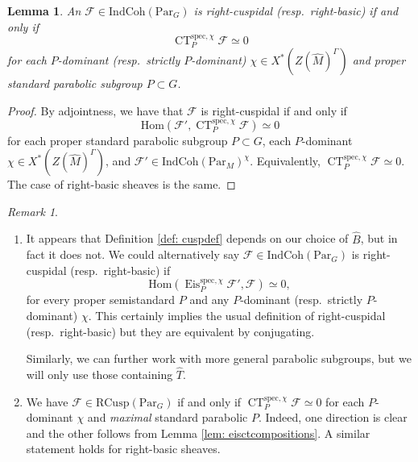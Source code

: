 \documentclass{amsart}
\newtheorem{lemma}[theorem]{Lemma}
\theoremstyle{definition}
\theoremstyle{remark}
\newtheorem{remark}[theorem]{Remark}
\numberwithin{equation}{section}
\newcommand{\mc}{\mathcal}
\newcommand{\Hom}{\mathrm{Hom}}
\newcommand{\spec}{\mathrm{spec}}
\newcommand{\wh}{\widehat}
\newcommand{\Par}{\mathrm{Par}}
\newcommand{\IndCoh}{\mathrm{IndCoh}}
\DeclareMathOperator{\Eis}{\mathrm{Eis}}
\DeclareMathOperator{\CT}{\mathrm{CT}}
\newcommand{\RCusp}{\mathrm{RCusp}}
\begin{document}
\begin{lemma}{\label{lem: cuspconstanttermdef}}
    An $\mc{F} \in \IndCoh(\Par_G)$ is right-cuspidal (resp.~right-basic) if and only if 
    \[
    \CT^{\spec, \chi}_{P} \mc{F} \simeq 0
    \]
    for each $P$-dominant (resp.~strictly $P$-dominant) $\chi \in X^*(Z(\wh{M})^{\Gamma})$ and proper standard parabolic subgroup $P \subset G$. 
\end{lemma}
\begin{proof}
By adjointness, we have that $\mc{F}$ is right-cuspidal if and only if \[
\Hom( \mc{F}', \CT^{\spec, \chi}_{P} \mc{F})\simeq 0\] for each proper standard parabolic subgroup $P \subset G$, each $P$-dominant $\chi \in X^*(Z(\wh{M})^{\Gamma})$, and $\mc{F}' \in \IndCoh(\Par_M)^{\chi}$. Equivalently, $\CT^{\spec, \chi}_{P} \mc{F} \simeq 0$. The case of right-basic sheaves is the same. 
\end{proof}
\begin{remark}{\label{rem: cuspbasicproperties}}
\begin{enumerate}
 \item  It appears that Definition \ref{def: cuspdef} depends on our choice of $\wh{B}$, but in fact it does not. We could alternatively say $\mc{F} \in \IndCoh(\Par_G)$ is right-cuspidal (resp.~right-basic) if \begin{equation*}
        \Hom(\Eis^{\spec, \chi}_{P} \mc{F}', \mc{F}) \simeq 0,
    \end{equation*}
    for every proper semistandard $P$ and any $P$-dominant  (resp.~strictly $P$-dominant) $\chi$. This certainly implies the usual definition of right-cuspidal (resp.~right-basic) but they are equivalent by conjugating. 
    
    Similarly, we can further work with more general parabolic subgroups, but we will only use those containing $\wh T$. 
\item We have $\mc{F} \in \RCusp(\Par_G)$ if and only if $\CT^{\spec, \chi}_P\mc{F}\simeq 0$ for each $P$-dominant $\chi$ and \emph{maximal} standard parabolic $P$. Indeed, one direction is clear and the other follows from Lemma \ref{lem: eisctcompositions}. A similar statement holds for right-basic sheaves. 
\end{enumerate}
\end{remark}
\end{document}
